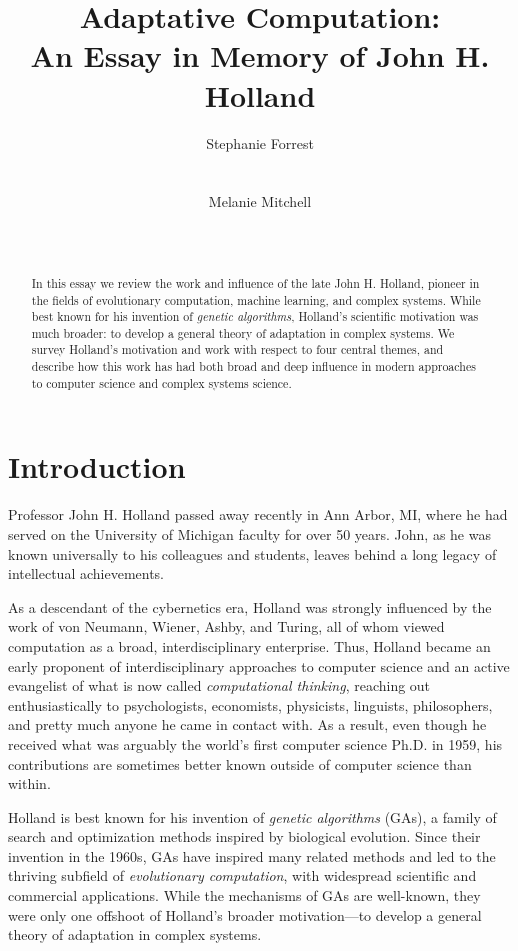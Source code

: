 \documentclass{sig-alternate}
\title{Adaptative Computation:\\ An Essay in Memory of John H. Holland}
\author 
{\alignauthor
 Stephanie Forrest\\
 \affaddr{University of New Mexico}\\
 \affaddr{Santa Fe Institute}\\
 \email{forrest@cs.unm.edu}
 \alignauthor
Melanie Mitchell \\
 \affaddr{Portland State University}\\
 \affaddr{Santa Fe Institute}\\
 \email{mm@pdx.edu}
}
\begin{document}
\maketitle

\begin{abstract}
In this essay we review the work and influence of the late John H. Holland, pioneer in the fields of evolutionary computation, machine learning, and complex systems.  While best known for his invention of \emph{genetic algorithms}, Holland's scientific motivation was much broader:  to develop a general theory of adaptation in complex systems.  We survey Holland's motivation and work with respect to four central themes, and describe how this work has had both broad and deep influence in modern approaches to computer science and complex systems science.  
\end{abstract}

\section{Introduction}

Professor John H. Holland passed away recently in Ann Arbor, MI, where
he had served on the University of Michigan faculty for over 50 years.
John, as he was known universally to his colleagues and students,
leaves behind a long legacy of intellectual achievements.

As a descendant of the cybernetics era, Holland was strongly
influenced by the work of von Neumann, Wiener, Ashby, and Turing, all
of whom viewed computation as a broad, interdisciplinary enterprise.
Thus, Holland became an early proponent of interdisciplinary
approaches to computer science and an active evangelist of what is now
called \emph{computational thinking}, reaching out enthusiastically to
psychologists, economists, physicists, linguists, philosophers, and
pretty much anyone he came in contact with.  As a result, even though
he received what was arguably the world's first computer science
Ph.D. in 1959, his contributions are sometimes better known outside of
computer science than within.

Holland is best known for his invention of \emph{genetic
  algorithms} (GAs), a family of search and optimization methods inspired
by biological evolution.  Since their invention in the 1960s, GAs have
inspired many related methods and led to the thriving subfield of
\emph{evolutionary computation}, with widespread scientific and
commercial applications.  While the mechanisms of GAs are well-known,
they were only one
offshoot of Holland's broader motivation---to develop a general
theory of adaptation in complex systems.  
\end{document}
